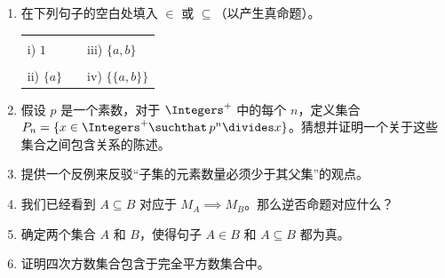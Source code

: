 \begin{enumerate}
    \item 
    在下列句子的空白处填入 $\in$ 或 $\subseteq$（以产生真命题）。
    
    \begin{tabular}{lcl}
    \rule{0pt}{16pt}i) $1$ \underline{\rule{36pt}{0pt}} $\{3, 2, 1, \{a, b\}\}$ & \rule{36pt}{0pt} & iii) $\{a, b\}$  \underline{\rule{36pt}{0pt}} $\{3, 2, 1, \{a, b\}\}$ \\
    \rule{0pt}{16pt}ii) $\{a\}$ \underline{\rule{36pt}{0pt}} $\{a, \{a, b\}\}$ & &
    iv) $\{\{a, b\}\}$  \underline{\rule{36pt}{0pt}} $\{a, \{a, b\}\}$ \\
    \end{tabular}
    
    \hint{$\in$, $\subseteq$, $\in$, $\subseteq$}
    
    \item  
    假设 $p$ 是一个素数，对于 $\Integers^+$ 中的每个 $n$，定义集合 $P_n = \{ x \in \Integers^+ \suchthat \, p^n \divides x \}$。猜想并证明一个关于这些集合之间包含关系的陈述。
    
    
    \wbvfill
    
    \item  
    提供一个反例来反驳“子集的元素数量必须少于其父集”的观点。
    
    \wbvfill
    
    \workbookpagebreak
    
    \item  
    我们已经看到 $A \subseteq B$ 对应于 $M_A \implies M_B$。那么逆否命题对应什么？
    
     
    \wbvfill
    
    \hintspagebreak
    
    \item 
    确定两个集合 $A$ 和 $B$，使得句子 $A \in B$ 和 $A \subseteq B$ 都为真。
    
    \wbvfill
    
    \item
    证明四次方数集合包含于完全平方数集合中。
    
    \wbvfill
    
    \end{enumerate}
    
    
    
